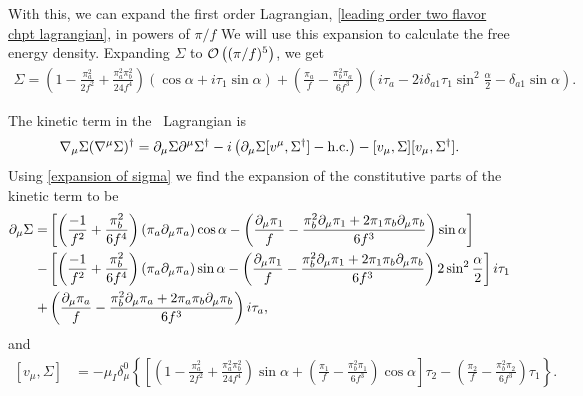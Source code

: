 %
With this, we can expand the first order Lagrangian, \autoref{leading order two flavor chpt lagrangian}, in powers of $\pi/f$
We will use this expansion to calculate the free energy density.
Expanding $\Sigma$ to $\mathcal O \left((\pi/f)^5\right)$, we get
\begin{align}
    \Sigma =
     \left(
        1 
        - \frac{\pi_a^2}{2f^2}
        + \frac{\pi_a^2\pi_b^2}{24f^4}
    \right)
    (\cos{\alpha} + i \tau_1 \sin{\alpha})
    +
    \left(
        \frac{\pi_a}{f} 
        - \frac{\pi_b^2\pi_a}{6f^3} 
    \right)
    \left(
        i\tau_a - 2i \delta_{a1}\tau_1\sin^2{\frac{\alpha}{2}} - \delta_{a1} \sin{\alpha}
    \right).
    \label{expansion of sigma}
\end{align}
%

The kinetic term in the \chpt\, Lagrangian is
\begin{equation}
    \nabla_\mu \Sigma (\nabla^\mu \Sigma)^\dagger 
    = \partial_\mu \Sigma \partial^\mu \Sigma^\dagger 
    - i \left(\partial_\mu \Sigma [v^\mu, \Sigma^\dagger] - \text{h.c.} \right)
    - [v_\mu,\Sigma][v_\mu, \Sigma^\dagger].
    \label{kinetic term}
\end{equation}
%
Using \autoref{expansion of sigma} we find the expansion of the constitutive parts of the kinetic term to be
\begin{align}
    \notag
    \partial_\mu \Sigma 
    = &
    \left[
        \left(
            \frac{-1}{f^2}
            + \frac{\pi_b^2}{6f^4}
        \right)
        (\pi_a \partial_\mu \pi_a)
        \cos{\alpha}
        - 
        \left(
            \frac{\partial_\mu \pi_1}{f} 
            - \frac{\pi_b^2 \partial_\mu\pi_1
            + 2 \pi_1 \pi_b \partial_\mu\pi_b}{6f^3} 
        \right)
        \sin{\alpha}
    \right]
    \\ \notag 
    - &
    \left[
        \left(
            \frac{-1}{f^2}
            + \frac{\pi_b^2}{6f^4}
        \right)
        (\pi_a \partial_\mu \pi_a)
        \sin{\alpha}
        - \left(
        \frac{\partial_\mu \pi_1}{f} 
        - \frac{\pi_b^2 \partial_\mu\pi_1
        + 2 \pi_1 \pi_b \partial_\mu\pi_b}{6f^3}
        \right)
        2 \sin^2{\frac{\alpha}{2}}
    \right]
    i \tau_1 \\ \label{Sigma derivative}
    +& 
    \left(
        \frac{\partial_\mu \pi_a}{f} 
        - \frac{\pi_b^2 \partial_\mu\pi_a 
        + 2 \pi_a \pi_b \partial_\mu\pi_b}{6f^3} 
    \right)
    i \tau_a,
\end{align}
%
and
\begin{align}
    [v_\mu,\Sigma]
    & =
    -\mu_I \delta^0_\mu
    \left\{
        \left[
        \left(
            1 
            - \frac{\pi_a^2}{2f^2}
            + \frac{\pi_a^2\pi_b^2}{24f^4}
        \right)
        \sin{\alpha}
        + 
        \left(
            \frac{\pi_1}{f} 
            - \frac{\pi_b^2\pi_1}{6f^3} 
        \right) \cos{\alpha}
        \right]
         \tau_2
        -
        \left(
            \frac{\pi_2}{f} 
            - \frac{\pi_b^2\pi_2}{6f^3} 
        \right)
        \tau_1
    \right\}.
    \label{sigma commutator}
\end{align}
